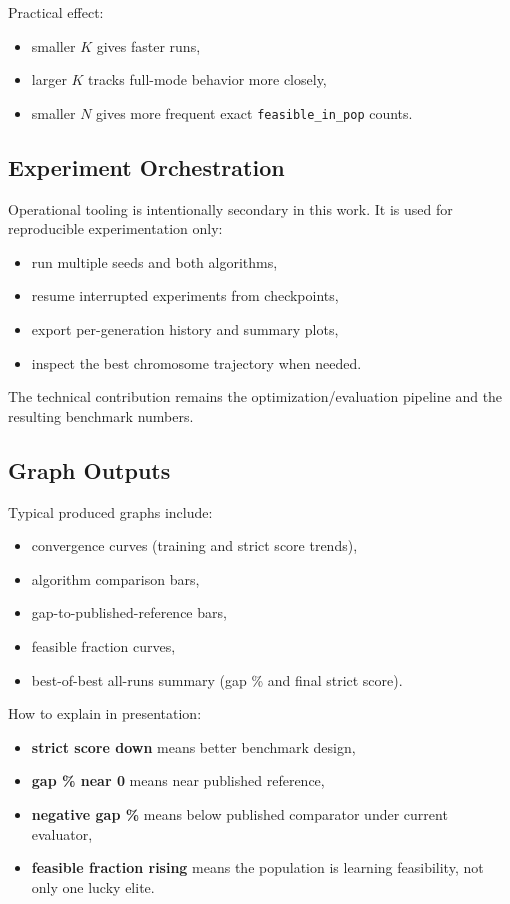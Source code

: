 \documentclass[12pt, a4paper]{article}
\begin{document}
Practical effect:
\begin{itemize}
	\item smaller $K$ gives faster runs,
	\item larger $K$ tracks full-mode behavior more closely,
	\item smaller $N$ gives more frequent exact \texttt{feasible\_in\_pop} counts.
\end{itemize}

\subsection{Experiment Orchestration}

Operational tooling is intentionally secondary in this work. It is used for reproducible experimentation only:
\begin{itemize}
	\item run multiple seeds and both algorithms,
	\item resume interrupted experiments from checkpoints,
	\item export per-generation history and summary plots,
	\item inspect the best chromosome trajectory when needed.
\end{itemize}

The technical contribution remains the optimization/evaluation pipeline and the resulting benchmark numbers.

\subsection{Graph Outputs}

Typical produced graphs include:
\begin{itemize}
	\item convergence curves (training and strict score trends),
	\item algorithm comparison bars,
	\item gap-to-published-reference bars,
	\item feasible fraction curves,
	\item best-of-best all-runs summary (gap \% and final strict score).
\end{itemize}

How to explain in presentation:
\begin{itemize}
	\item \textbf{strict score down} means better benchmark design,
	\item \textbf{gap \% near 0} means near published reference,
	\item \textbf{negative gap \%} means below published comparator under current evaluator,
	\item \textbf{feasible fraction rising} means the population is learning feasibility, not only one lucky elite.
\end{itemize}
\end{document}
